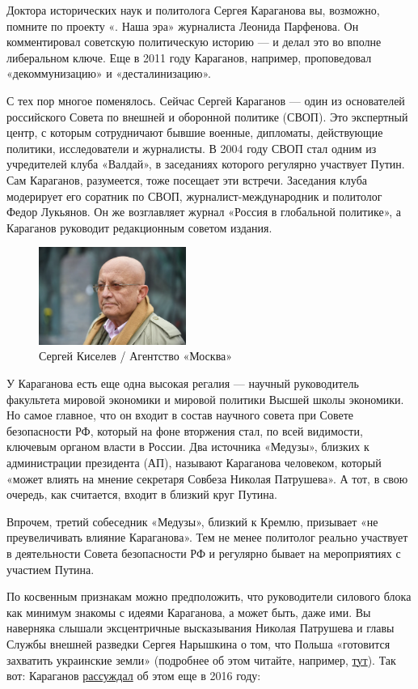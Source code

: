 Доктора исторических наук и политолога Сергея Караганова вы, возможно, помните по проекту «. Наша эра» журналиста Леонида Парфенова. Он комментировал советскую политическую историю — и делал это во вполне либеральном ключе. Еще в 2011 году Караганов, например, проповедовал «декоммунизацию» и «десталинизацию».

С тех пор многое поменялось. Сейчас Сергей Караганов --- один из основателей российского Совета по внешней и оборонной политике (СВОП). Это экспертный центр, с которым сотрудничают бывшие военные, дипломаты, действующие политики, исследователи и журналисты. В 2004 году СВОП стал одним из учредителей клуба «Валдай», в заседаниях которого регулярно участвует Путин. Сам Караганов, разумеется, тоже посещает эти встречи. Заседания клуба модерирует его соратник по СВОП, журналист-международник и политолог Федор Лукьянов. Он же возглавляет журнал «Россия в глобальной политике», а Караганов руководит редакционным советом издания.

\begin{figure}
    \centering
    \includegraphics[width=0.43\textwidth]{img/karaganov.png}
    \caption{Сергей Киселев / Агентство «Москва»}
\end{figure}
У Караганова есть еще одна высокая регалия --- научный руководитель факультета мировой экономики и мировой политики Высшей школы экономики. Но самое главное, что он входит в состав научного совета при Совете безопасности РФ, который на фоне вторжения стал, по всей видимости, ключевым органом власти в России. Два источника «Медузы», близких к администрации президента (АП), называют Караганова человеком, который «может влиять на мнение секретаря Совбеза Николая Патрушева». А тот, в свою очередь, как считается, входит в близкий круг Путина.

Впрочем, третий собеседник «Медузы», близкий к Кремлю, призывает «не преувеличивать влияние Караганова». Тем не менее политолог реально участвует в деятельности Совета безопасности РФ и регулярно бывает на мероприятиях с участием Путина.

По косвенным признакам можно предположить, что руководители силового блока как минимум знакомы с идеями Караганова, а может быть, даже  ими. Вы наверняка слышали эксцентричные высказывания Николая Патрушева и главы Службы внешней разведки Сергея Нарышкина о том, что Польша «готовится захватить украинские земли» (подробнее об этом читайте, например, \href{https://carnegieendowment.org/politika/88530}{тут}). Так вот: Караганов \href{https://globalaffairs.ru/articles/rakety-v-evrope-vospominaniya-o-budushhem/}{рассуждал} об этом еще в 2016 году:

